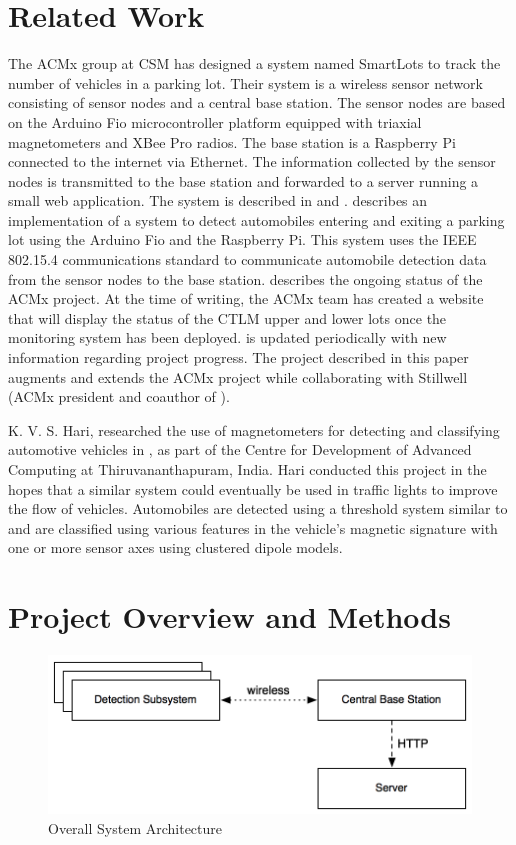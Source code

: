\documentclass[11pt, oneside, fullpage, doublespace]{article}
\begin{document}
\section{Related Work}
The ACMx group at CSM has designed a system named SmartLots to track the number of vehicles in a parking lot. Their system is a wireless sensor network consisting of sensor nodes and a central base station. The sensor nodes are based on the Arduino Fio microcontroller platform equipped with triaxial magnetometers and XBee Pro radios. The base station is a Raspberry Pi connected to the internet via Ethernet. The information collected by the sensor nodes is transmitted to the base station and forwarded to a server running a small web application. The system is described in \cite{stillwell2013} and \cite{parkingWiki}. \cite{stillwell2013} describes an implementation of a system to detect automobiles entering and exiting a parking lot using the Arduino Fio and the Raspberry Pi. This system uses the IEEE 802.15.4 communications standard to communicate automobile detection data from the sensor nodes to the base station. \cite{parkingWiki} describes the ongoing status of the ACMx project. At the time of writing, the ACMx team has created a website that will display the status of the CTLM upper and lower lots once the monitoring system has been deployed. \cite{parkingWiki} is updated periodically with new information regarding project progress. The project described in this paper augments and extends the ACMx project while collaborating with Stillwell (ACMx president and coauthor of \cite{stillwell2013}).

K. V. S. Hari, researched the use of magnetometers for detecting and classifying automotive vehicles in \cite{itsindia}, as part of the Centre for Development of Advanced Computing at Thiruvananthapuram, India. Hari conducted this project in the hopes that a similar system could eventually be used in traffic lights to improve the flow of vehicles. Automobiles are detected using a threshold system similar to \cite{stillwell2013} and are classified using various features in the vehicle's magnetic signature with one or more sensor axes using clustered dipole models.

\section{Project Overview and Methods}

\begin{figure}
\begin{center}
\includegraphics[width=4.5in]{architecture}
\end{center}
\caption{Overall System Architecture}
\label{fig:system}
\end{figure}
\end{document}
